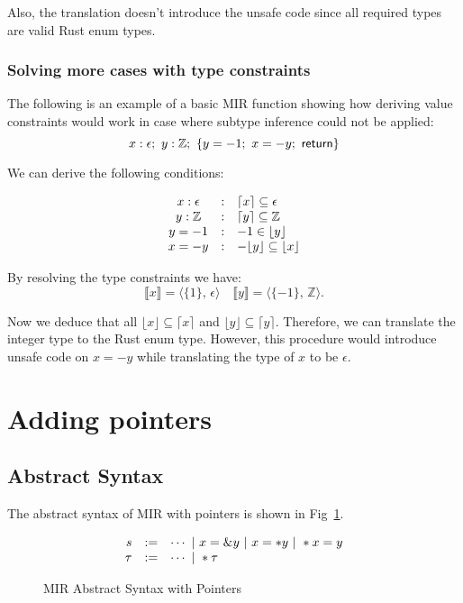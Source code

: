 \documentclass[peerreview, 10pt]{IEEEtran}
\newcommand{\Z}{\ensuremath{\mathbb{Z}}}
\newcommand{\cons}[1]{\ensuremath{\llbracket#1\rrbracket}}
\newcommand{\consp}[2]{\ensuremath{\langle#1,\,#2\rangle}}
\newcommand{\floor}[1]{\ensuremath{\lfloor#1\rfloor}}
\newcommand{\ceil}[1]{\ensuremath{\lceil#1\rceil}}
\newcommand{\enum}{\ensuremath{\epsilon}}
\newcommand{\ifrule}[2]{\ensuremath{#1&:&#2}}
\begin{document}
Also, the translation doesn't introduce the unsafe code since all required types are valid Rust enum types.

\subsubsection{Solving more cases with type constraints}
The following is an example of a basic MIR function showing how deriving value constraints would work in case where subtype inference could not be applied:
\[
  x:\enum;\ y:\Z;\ \{y=-1;\ x=-y;\ \sf return\}
\]

We can derive the following conditions:

\[
\begin{array}{@{}ccl@{}}
  \ifrule{x:\enum}{\ceil{x}\subseteq\enum}\\
  \ifrule{y:\Z}{\ceil{y}\subseteq\Z}\\
  \ifrule{y=-1}{-1\in\floor{y}}\\
  \ifrule{x=-y}{-\floor{y}\subseteq\floor{x}}
\end{array}
\]

By resolving the type constraints we have:
\[
\cons{x}=\consp{\{1\}}{\enum}\quad\cons{y}=\consp{\{-1\}}{\Z}.
\]

Now we deduce that all $\floor{x}\subseteq\ceil{x}$ and $\floor{y}\subseteq\ceil{y}$. Therefore, we can translate the integer type to the Rust enum type. However, this procedure would introduce unsafe code on $x=-y$ while translating the type of $x$ to be $\enum$.

\section{Adding pointers}

\subsection{Abstract Syntax}

The abstract syntax of MIR with pointers is shown in Fig~\ref{fig:mir-pointers-absyn}.

\begin{figure}[ht]
\centering
\begin{framed}
\[
  \begin{array}{@{}rcl@{}}
    s &:=& \cdots\ |\ x=\&y\ |\ x=*y\ |\ *x=y \\
    \tau &:=& \cdots\ |\ *\tau \\
  \end{array}
\]
\end{framed}
\caption{MIR Abstract Syntax with Pointers}
\label{fig:mir-pointers-absyn}
\end{figure}
\end{document}
